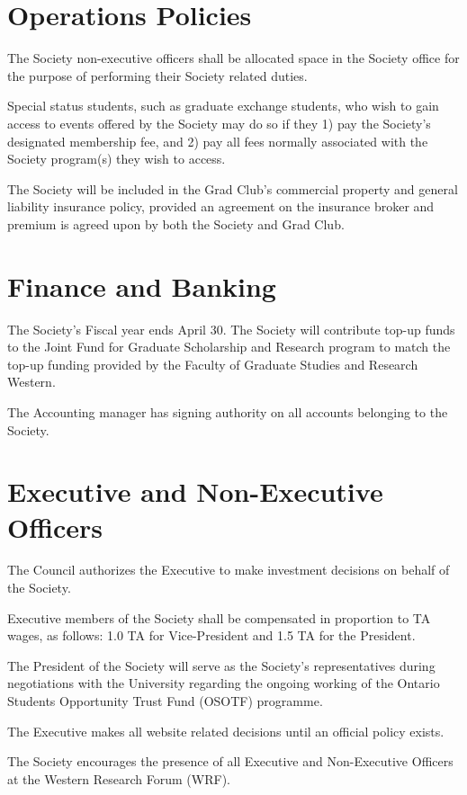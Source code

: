 \section{Operations Policies}
\begin{longenum}[ label*=\thesection.\arabic*., align=left]
\item The Society non-executive officers shall be allocated space in the Society office for the purpose of performing their Society related duties.
\item Special status students, such as graduate exchange students, who wish to gain access to events offered by the Society may do so if they 1) pay the Society’s designated membership fee, and 2) pay all fees normally associated with the Society program(s) they wish to access.
\item The Society will be included in the Grad Club’s commercial property and general liability insurance policy, provided an agreement on the insurance broker and premium is agreed upon by both the Society and Grad Club.
\end{longenum}

\section{Finance and Banking}
\begin{longenum}[ label*=\thesection.\arabic*., align=left]
\item The Society’s Fiscal year ends April 30. The Society will contribute top-up funds to the Joint Fund for Graduate Scholarship and Research program to match the top-up funding provided by the Faculty of Graduate Studies and Research Western.
\item The Accounting manager has signing authority on all accounts belonging to the Society.
\end{longenum}

\section{Executive and Non-Executive Officers}
\begin{longenum}[ label*=\thesection.\arabic*., align=left]
\item The Council authorizes the Executive to make investment decisions on behalf of the Society.
\item Executive members of the Society shall be compensated in proportion to TA wages, as follows: 1.0 TA for Vice-President and 1.5 TA for the President.
\item The President of the Society will serve as the Society’s representatives during negotiations with the University regarding the ongoing working of the Ontario Students Opportunity Trust Fund (OSOTF) programme.
\item The Executive makes all website related decisions until an official policy exists.
\item The Society encourages the presence of all Executive and Non-Executive Officers at the Western Research Forum (WRF).
\end{longenum}

